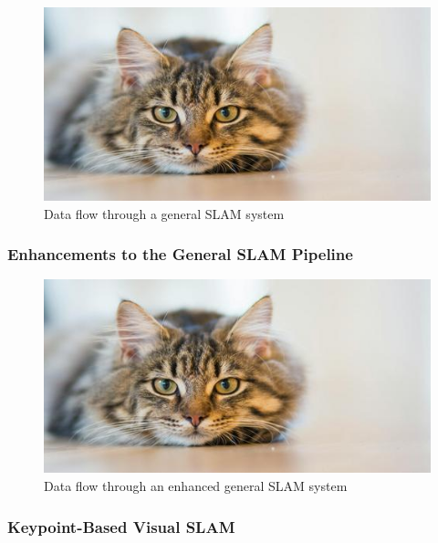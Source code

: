 \begin{figure}[ht!]
    \includegraphics[width=\textwidth]{resources/placeholder.jpeg}
    \caption{Data flow through a general SLAM system}
    \label{fig:general_slam_pipeline}
\end{figure}

\subsubsection{Enhancements to the General SLAM Pipeline}

\begin{figure}[ht!]
    \includegraphics[width=\textwidth]{resources/placeholder.jpeg}
    \caption{Data flow through an enhanced general SLAM system}
    \label{fig:enhanced_general_slam_pipeline}
\end{figure}

\subsubsection{Keypoint-Based Visual SLAM}


